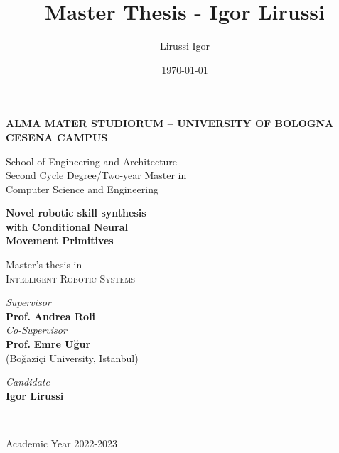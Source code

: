 \title{Master Thesis - Igor Lirussi}
\author{Lirussi Igor}
\date{\today}

\begin{titlepage}
	\begin{center}
		
		\large
		\textbf{ALMA MATER STUDIORUM -- UNIVERSITY OF BOLOGNA \\ CESENA CAMPUS }
		\\
		\noindent\hrulefill
		\vspace{0.4cm}
		
		\Large
		School of Engineering and Architecture \\
		Second Cycle Degree/Two-year Master in \\Computer Science and Engineering
		
		\Huge
		\vspace{4cm}
		\textbf{
			Novel robotic skill synthesis 
			\\
			with Conditional Neural 
			\\
                Movement Primitives
		}
		
		\large
		\vspace{1cm}
		Master's thesis in 
		\\
		\textsc{Intelligent Robotic Systems}
		
		\vspace{5.5cm}
		\begin{minipage}[t]{0.64\textwidth}
			\begin{flushleft}
				\textit{Supervisor} 
				\\ 
				\textbf{Prof.} \textbf{Andrea Roli}
				\\
				\vspace{0.4cm}
				\textit{Co-Supervisor} 
				\\
				\textbf{Prof.} \textbf{Emre Uğur} \\(Boğaziçi University, Istanbul)
			\end{flushleft}
		\end{minipage}
		\begin{minipage}[t]{0.34\textwidth}
			\begin{flushright}
				\textit{Candidate} 
				\\ 
				\textbf{Igor Lirussi}
			\end{flushright}
		\end{minipage}\\
		
		\vfill
		\noindent\hrulefill
		\vspace{0.3cm}
		\Large
		

		Academic Year 2022-2023
	\end{center}
\end{titlepage}
\restoregeometry
